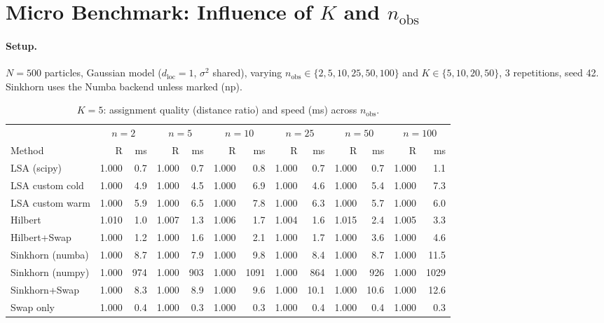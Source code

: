 \documentclass[11pt,a4paper]{article}
\begin{document}
\section{Micro Benchmark: Influence of $K$ and $n_{\text{obs}}$}
\label{sec:micro}

\paragraph{Setup.} $N = 500$ particles, Gaussian model ($d_{\text{loc}}=1$, $\sigma^2$ shared), varying $n_{\text{obs}} \in \{2, 5, 10, 25, 50, 100\}$ and $K \in \{5, 10, 20, 50\}$, 3 repetitions, seed 42. Sinkhorn uses the Numba backend unless marked (np).

\begin{table}[h!]
\centering
\caption{$K = 5$: assignment quality (distance ratio) and speed (ms) across $n_{\text{obs}}$.}
\label{tab:K5}
\small
\begin{tabular}{l rrrrrrrrrrrr}
\toprule
& \multicolumn{2}{c}{$n=2$} & \multicolumn{2}{c}{$n=5$} & \multicolumn{2}{c}{$n=10$} & \multicolumn{2}{c}{$n=25$} & \multicolumn{2}{c}{$n=50$} & \multicolumn{2}{c}{$n=100$} \\
\cmidrule(lr){2-3}\cmidrule(lr){4-5}\cmidrule(lr){6-7}\cmidrule(lr){8-9}\cmidrule(lr){10-11}\cmidrule(lr){12-13}
Method & R & ms & R & ms & R & ms & R & ms & R & ms & R & ms \\
\midrule
LSA (scipy)         & 1.000 & 0.7 & 1.000 & 0.7 & 1.000 & 0.8 & 1.000 & 0.7 & 1.000 & 0.7 & 1.000 & 1.1 \\
LSA custom cold     & 1.000 & 4.9 & 1.000 & 4.5 & 1.000 & 6.9 & 1.000 & 4.6 & 1.000 & 5.4 & 1.000 & 7.3 \\
LSA custom warm     & 1.000 & 5.9 & 1.000 & 6.5 & 1.000 & 7.8 & 1.000 & 6.3 & 1.000 & 5.7 & 1.000 & 6.0 \\
Hilbert             & 1.010 & 1.0 & 1.007 & 1.3 & 1.006 & 1.7 & 1.004 & 1.6 & 1.015 & 2.4 & 1.005 & 3.3 \\
Hilbert+Swap        & 1.000 & 1.2 & 1.000 & 1.6 & 1.000 & 2.1 & 1.000 & 1.7 & 1.000 & 3.6 & 1.000 & 4.6 \\
Sinkhorn (numba)    & 1.000 & 8.7 & 1.000 & 7.9 & 1.000 & 9.8 & 1.000 & 8.4 & 1.000 & 8.7 & 1.000 & 11.5 \\
Sinkhorn (numpy)    & 1.000 & 974 & 1.000 & 903 & 1.000 & 1091 & 1.000 & 864 & 1.000 & 926 & 1.000 & 1029 \\
Sinkhorn+Swap       & 1.000 & 8.3 & 1.000 & 8.9 & 1.000 & 9.6 & 1.000 & 10.1 & 1.000 & 10.6 & 1.000 & 12.6 \\
Swap only           & 1.000 & 0.4 & 1.000 & 0.3 & 1.000 & 0.3 & 1.000 & 0.4 & 1.000 & 0.4 & 1.000 & 0.3 \\
\bottomrule
\end{tabular}
\end{table}
\end{document}
